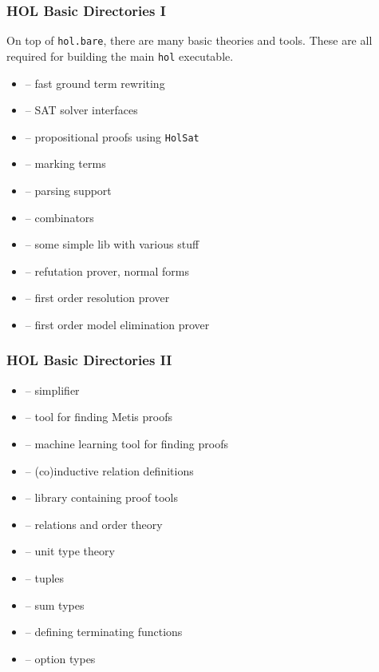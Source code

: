\begin{frame}
\frametitle{HOL Basic Directories I}

On top of \texttt{hol.bare}, there are many basic theories and tools. These
are all required for building the main \texttt{hol} executable.

\begin{itemize}
\item {} -- fast ground term rewriting
\item {} -- SAT solver interfaces
\item {} -- propositional proofs using \texttt{HolSat}
\item {} -- marking terms
\item {} -- parsing support 
\item {} -- combinators
\item {} -- some simple lib with various stuff
\item {} -- refutation prover, normal forms 
\item {} -- first order resolution prover
\item {} -- first order model elimination prover
\end{itemize}
\end{frame}

\begin{frame}
\frametitle{HOL Basic Directories II}

\begin{itemize}
\item {} -- simplifier
\item {} -- tool for finding Metis proofs
\item {} -- machine learning tool for finding proofs
\item {} -- (co)inductive relation definitions
\item {} -- library containing proof tools
\item {} -- relations and order theory
\item {} -- unit type theory
\item {} -- tuples
\item {} -- sum types
\item {} -- defining terminating functions
\item {} -- option types
\end{itemize}
\end{frame}

